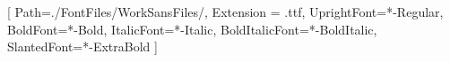 \setmainfont{WorkSans}[
    Path=./FontFiles/WorkSansFiles/,
    Extension = .ttf,
    UprightFont=*-Regular,
    BoldFont=*-Bold,
    ItalicFont=*-Italic,
    BoldItalicFont=*-BoldItalic,
    SlantedFont=*-ExtraBold
]